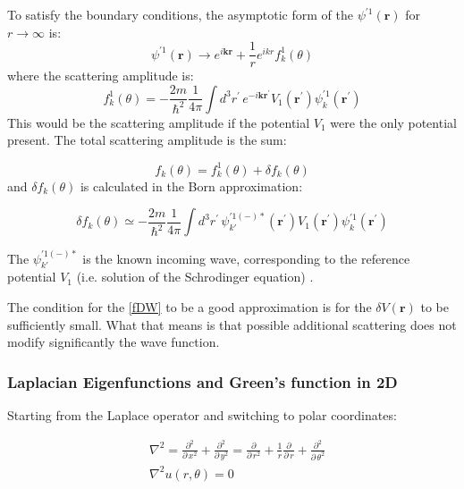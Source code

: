To satisfy the boundary conditions, the asymptotic form of the $ \psi^{'1}(\mathbf{r}) $ for $ r \rightarrow \infty$  is:
\begin{equation}
\psi^{'1}(\mathbf{r}) \rightarrow e^{i\mathbf{k}\mathbf{r}} + \frac{1}{r} e^{ikr}f^1_k(\theta)
\end{equation}
where the scattering amplitude is:
\begin{equation}
f^1_k(\theta) = -\frac{2m}{\hbar^2}\frac{1}{4\pi}\int{d^3r^{'}\,e^{-i\mathbf{k}\mathbf{r}^{'}}V_1(\mathbf{r}^{'})\psi^{'1}_k(\mathbf{r}^{'})}
\end{equation}
This would be the scattering amplitude if the potential $ V_1 $ were the only potential present. The total scattering amplitude is the sum:

\begin{equation}
f_k(\theta) = f^1_k(\theta) + \delta f_k(\theta)
\end{equation}
and $ \delta f_k(\theta) $ is calculated in the Born approximation:

\begin{equation}\label{fDW}
\delta f_k(\theta) \simeq -\frac{2m}{\hbar^2}\frac{1}{4\pi}\int{d^3r^{'}\,\psi^{'1(-)*}_{k'}(\mathbf{r}^{'})V_1(\mathbf{r}^{'})\psi^{'1}_k(\mathbf{r}^{'})}
\end{equation}

The $ \psi^{'1(-)*}_{k'} $ is the known incoming wave, corresponding to the reference potential $ V_1 $ (i.e. solution of the Schrodinger equation) .

The condition for the \eqref{fDW} to be a good approximation is for the $ \delta V(\mathbf{r}) $ to be sufficiently small. What that means is that possible additional scattering does not modify significantly the wave function.

\subsubsection{Laplacian Eigenfunctions and Green's function in 2D}

Starting from the Laplace operator and switching to polar coordinates:

\begin{equation}
\begin{split}
& \nabla^2 = \frac{\partial^2}{\partial\,x^2} + \frac{\partial^2}{\partial\,y^2} = \frac{\partial}{\partial\,r^2} + \frac{1}{r}\frac{\partial}{\partial\,r} + \frac{\partial^2}{\partial\,\theta^2} \\[.8em]
& \nabla^2u(r,\theta) = 0
\end{split}
\end{equation}

